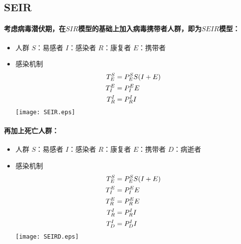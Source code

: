 \subsection{SEIR}
\paragraph{考虑病毒潜伏期，在$SIR$模型的基础上加入病毒携带者人群，即为$SEIR$模型：}
\begin{itemize}
	\item 人群
	      \subitem $S$：易感者
	      \subitem $I$：感染者
	      \subitem $R$：康复者
	      \subitem $E$：携带者
	\item 感染机制
	      \subitem
	      \begin{align}
		      T^{S}_{E}&=P^{S}_{E}S(I+E) \\
		      T^{E}_{I}&=P^{E}_{I}E      \\
		      T^{I}_{R}&=P^{I}_{R}I
	      \end{align}
	      \texttt{[image: SEIR.eps]}
\end{itemize}
\paragraph{再加上死亡人群：}
\begin{itemize}
	\item 人群
	      \subitem $S$：易感者
	      \subitem $I$：感染者
	      \subitem $R$：康复者
	      \subitem $E$：携带者
	      \subitem $D$：病逝者
	\item 感染机制
	      \subitem
	      \begin{align}
		      T^{S}_{E}&=P^{S}_{E}S(I+E) \\
		      T^{E}_{I}&=P^{E}_{I}E      \\
		      T^{E}_{R}&=P^{E}_{R}E      \\
		      T^{I}_{R}&=P^{I}_{R}I      \\
		      T^{I}_{D}&=P^{I}_{D}I
	      \end{align}
	      \texttt{[image: SEIRD.eps]}
\end{itemize}